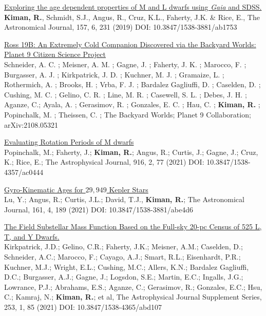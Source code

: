 \documentclass[10pt]{cv}
\begin{document}
\begin{llist}
\href{https://ui.adsabs.harvard.edu/abs/2019AJ....157..231K/abstract}{Exploring the age dependent properties of M and L dwarfs using \textit{Gaia} and SDSS.}\\
\textbf{Kiman, R.}, Schmidt, S.J., Angus, R., Cruz, K.L., Faherty, J.K. \& Rice, E., The Astronomical Journal, 157, 6, 231 (2019) DOI: 10.3847/1538-3881/ab1753 


\href{https://ui.adsabs.harvard.edu/abs/2021arXiv210805321S/abstract}{Ross 19B: An Extremely Cold Companion Discovered via the Backyard Worlds: Planet 9 Citizen Science Project}\\
Schneider, A. C. ; Meisner, A. M. ; Gagne, J. ; Faherty, J. K. ; Marocco, F. ; Burgasser, A. J. ; Kirkpatrick, J. D. ; Kuchner, M. J. ; Gramaize, L. ; Rothermich, A. ; Brooks, H. ; Vrba, F. J. ; Bardalez Gagliuffi, D. ; Caselden, D. ; Cushing, M. C. ; Gelino, C. R. ; Line, M. R. ; Casewell, S. L. ; Debes, J. H. ; Aganze, C.; Ayala, A. ; Gerasimov, R. ; Gonzales, E. C. ; Hau, C. ; \textbf{Kiman, R.} ; Popinchalk, M. ; Theissen, C. ; The Backyard Worlds; Planet 9 Collaboration; arXiv:2108.05321

\href{https://ui.adsabs.harvard.edu/abs/2021ApJ...916...77P/abstract}{Evaluating Rotation Periods of M dwarfs}\\
Popinchalk, M.; Faherty, J.; \textbf{Kiman, R.}; Angus, R.; Curtis, J.; Gagne, J.; Cruz, K.; Rice, E.; The Astrophysical Journal, 916, 2, 77 (2021) DOI:  10.3847/1538-4357/ac0444

\href{https://ui.adsabs.harvard.edu/abs/2021arXiv210201772Y/abstract}{Gyro-Kinematic Ages for $29,949$ Kepler Stars}\\
Lu, Y.; Angus, R.; Curtis, J.L.; David, T.J., \textbf{​Kiman, R.}​; The Astronomical Journal, 161,  4, 189 (2021) DOI: 10.3847/1538-3881/abe4d6


\href{https://ui.adsabs.harvard.edu/abs/2021ApJS..253....7K/abstract}{The Field Substellar Mass Function Based on the Full-sky 20-pc Census of 525 L, T, and Y Dwarfs.}\\
Kirkpatrick, J.D.; Gelino, C.R.; Faherty, J.K.; Meisner, A.M.; Caselden, D.; Schneider, A.C.; Marocco, F.; Cayago, A.J.; Smart, R.L.; Eisenhardt, P.R.; Kuchner, M.J.; Wright, E.L.; Cushing, M.C.; Allers, K.N.; Bardalez Gagliuffi, D.C.; Burgasser, A.J.; Gagne, J.; Logsdon, S.E.; Martin, E.C.; Ingalls, J.G.; Lowrance, P.J.; Abrahams, E.S.; Aganze, C.; Gerasimov, R.; Gonzales, E.C.; Hsu, C.; Kamraj, N.; \textbf{​Kiman, R.}​; et al, The Astrophysical Journal Supplement Series, 253, 1, 85 (2021) DOI: 10.3847/1538-4365/abd107


\end{llist}
\end{document}
